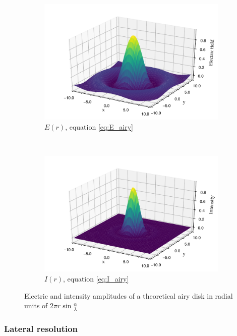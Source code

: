 \begin{figure}
    \centering
    \begin{subfigure}[b]{\textwidth}
        \includegraphics{+airy_E_fill}
        \caption{$E(r)$, equation \eqref{eq:E_airy}}
        \label{fig:airy_E_fill}
    \end{subfigure}
    ~
    \begin{subfigure}[b]{\textwidth}
        \includegraphics{+airy_I_fill}
        \caption{$I(r)$, equation \eqref{eq:I_airy}}
        \label{fig:airy_I_fill}
    \end{subfigure}
    \caption{Electric and intensity amplitudes of a theoretical \gls{airy disk} in radial units of $2\pi r \sin \frac{\alpha}{\lambda}$}
    \label{fig:airy_disk}
\end{figure}

\subsubsection{Lateral resolution}

